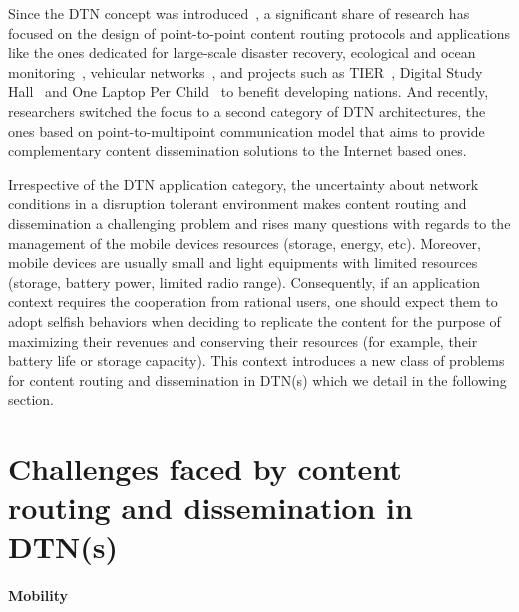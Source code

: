 Since the DTN concept was introduced~\cite{dtnrg}, a significant share of research has focused on the design of point-to-point content routing protocols and applications like the ones dedicated for large-scale disaster recovery, ecological and ocean monitoring~\cite{Juang:zebranet, Heidemann:Acoustic}, vehicular networks~\cite{Levine:MaxProp}, and projects such as TIER~\cite{TIER}, Digital Study Hall~\cite{DSH} and One Laptop Per Child~\cite{OneLaptopPerChild} to benefit developing nations. And recently, researchers switched the focus to a second category of DTN architectures, the ones based on point-to-multipoint communication model that aims to provide complementary content dissemination solutions to the Internet based ones. 

Irrespective of the DTN application category, the uncertainty about network conditions in a disruption tolerant environment makes content routing and dissemination a challenging problem and rises many questions with regards to the management of the mobile devices resources (storage, energy, etc). Moreover, mobile devices are usually small and light equipments with limited resources (storage, battery power, limited radio range). Consequently, if an application context requires the cooperation from rational users, one should expect them to adopt selfish behaviors when deciding to replicate the content for the purpose of maximizing their revenues and conserving their resources (for example, their battery life or storage capacity). This context introduces a new class of problems for content routing and dissemination in DTN(s) which we detail in the following section.

\section{Challenges faced by content routing and dissemination in DTN(s)}

\paragraph{Mobility}

